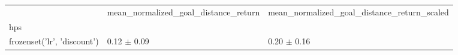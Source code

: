 \begin{tabular}{lll}
\toprule
 & mean_normalized_goal_distance_return & mean_normalized_goal_distance_return_scaled \\
hps &  &  \\
\midrule
frozenset({'lr', 'discount'}) & 0.12 $\pm$ 0.09 & 0.20 $\pm$ 0.16 \\
\bottomrule
\end{tabular}
